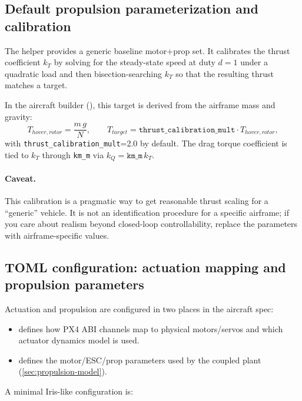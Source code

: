 \subsection{Default propulsion parameterization and calibration}
\label{sec:propulsion-defaults}

The helper  provides a generic baseline motor+prop set. It calibrates the thrust coefficient $k_T$ by solving for the steady-state speed at duty $d=1$ under a quadratic load and then bisection-searching $k_T$ so that the resulting thrust matches a target.

In the aircraft builder (), this target is derived from the airframe mass and gravity:
\begin{equation}
  T_{hover,rotor} = \frac{m\,g}{N},\qquad T_{target} = \texttt{thrust\_calibration\_mult}\cdot T_{hover,rotor},
\end{equation}
with \texttt{thrust\_calibration\_mult}=2.0 by default. The drag torque coefficient is tied to $k_T$ through \texttt{km\_m} via $k_Q = \texttt{km\_m}\,k_T$.

\paragraph{Caveat.}
This calibration is a pragmatic way to get reasonable thrust scaling for a ``generic'' vehicle. It is not an identification procedure for a specific airframe; if you care about realism beyond closed-loop controllability, replace the parameters with airframe-specific values.


\subsection{TOML configuration: actuation mapping and propulsion parameters}
\label{sec:actuation-toml}

Actuation and propulsion are configured in two places in the aircraft spec:
\begin{itemize}[leftmargin=*,itemsep=2pt]
  \item \code{[actuation]} defines how PX4 ABI channels map to physical motors/servos and which actuator dynamics model is used.
  \item {} defines the motor/ESC/prop parameters used by the coupled plant (\cref{sec:propulsion-model}).
\end{itemize}

A minimal Iris-like configuration is:

